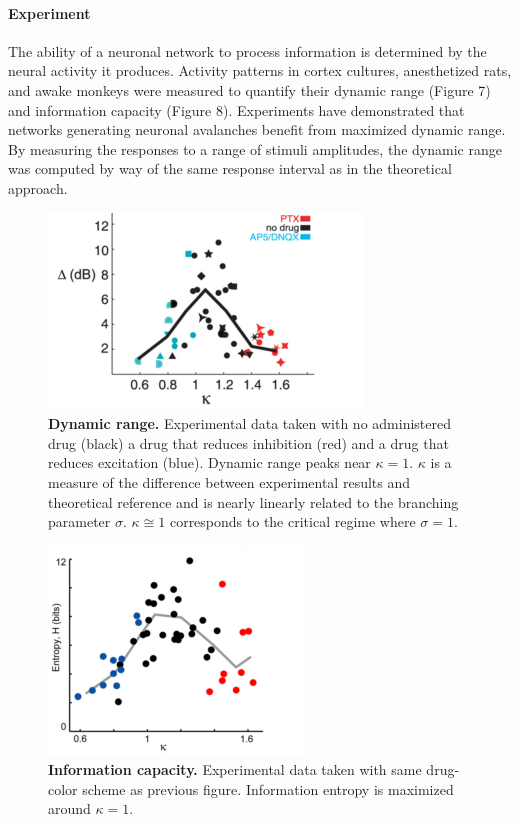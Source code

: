 \documentclass[12pt]{article}
\begin{document}
\paragraph{Experiment}
The ability of a neuronal network to process information is determined by the neural activity it produces. Activity patterns in cortex cultures, anesthetized rats, and awake monkeys were measured to quantify their dynamic range (Figure 7) and information capacity (Figure 8). Experiments have demonstrated that networks generating neuronal avalanches benefit from maximized dynamic range\cite{Shew2009b}. By measuring the responses to a range of stimuli amplitudes, the dynamic range was computed by way of the same response interval as in the theoretical approach.

\begin{figure}      
  \begin{center}    
 \includegraphics[width=.5\textwidth]{dynamicrangeexpplenz}    
    \caption{\textbf{Dynamic range.} Experimental data taken with no administered drug (black) a drug that reduces inhibition (red) and a drug that reduces excitation (blue). Dynamic range peaks near $\kappa = 1$. $\kappa$ is a measure of the difference between experimental results and theoretical reference and is nearly linearly related to the branching parameter $\sigma$. $\kappa \cong 1$ corresponds to the critical regime where $\sigma = 1$. \cite{Shew2009b}}   
   \label{Figure::Dynamic Range Experiment}   
  \end{center}     
   \end{figure}
  
\begin{figure}      
  \begin{center}    
 \includegraphics[width=.40\textwidth]{entropyplenz}    
    \caption{\textbf{Information capacity.} Experimental data taken with same drug-color scheme as previous figure. Information entropy is maximized around $\kappa = 1$. \cite{Shew2011a}}   
   \label{Figure::Entropy / information maximized experimental}   
  \end{center}     
   \end{figure}
   
\end{document}
